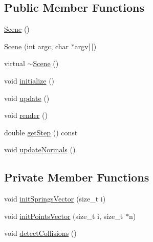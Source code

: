 \subsection*{Public Member Functions}
\begin{DoxyCompactItemize}
\item 
\hyperlink{classstd_1_1Scene_a8398f31d8872107aa869418bb7c24c25}{Scene} ()
\item 
\hyperlink{classstd_1_1Scene_ae405abc9a41334e8aadb6e731c44df9c}{Scene} (int argc, char $\ast$argv\mbox{[}$\,$\mbox{]})
\item 
virtual \hyperlink{classstd_1_1Scene_abcd83c86b41e1719e9a140bcf431d881}{$\sim$\+Scene} ()
\item 
void \hyperlink{classstd_1_1Scene_a3e68e24782a8a3d20434b2480ffa46ef}{initialize} ()
\item 
void \hyperlink{classstd_1_1Scene_afe443c3e9196ee13a701a0813e435239}{update} ()
\item 
void \hyperlink{classstd_1_1Scene_a6f5536cb6bf3df944508583badad1bd9}{render} ()
\item 
double \hyperlink{classstd_1_1Scene_a1cb16e4e736e71cd0c7cc53769e24261}{get\+Step} () const 
\item 
void \hyperlink{classstd_1_1Scene_a286eefef820ee9328dce8ec00b15b56f}{update\+Normals} ()
\end{DoxyCompactItemize}
\subsection*{Private Member Functions}
\begin{DoxyCompactItemize}
\item 
void \hyperlink{classstd_1_1Scene_a2616e46d7f209c505d8753f4878dd055}{init\+Springs\+Vector} (size\+\_\+t i)
\item 
void \hyperlink{classstd_1_1Scene_afd32b8076a67538f18533387fc58d61f}{init\+Points\+Vector} (size\+\_\+t i, size\+\_\+t $\ast$n)
\item 
void \hyperlink{classstd_1_1Scene_acf0a57cadc3904cb157058a3f12d8b9a}{detect\+Collisions} ()
\end{DoxyCompactItemize}
